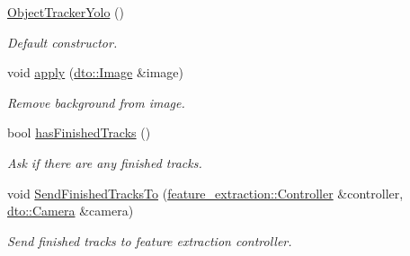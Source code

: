 \begin{DoxyCompactItemize}
\item 
\mbox{\label{classimage__tracking_1_1_object_tracker_yolo_a6f2f07641fa0263d03f43a46e7c7dc83}} 
\mbox{\hyperlink{classimage__tracking_1_1_object_tracker_yolo_a6f2f07641fa0263d03f43a46e7c7dc83}{Object\+Tracker\+Yolo}} ()
\begin{DoxyCompactList}\small\item\em Default constructor. \end{DoxyCompactList}\item 
\mbox{\label{classimage__tracking_1_1_object_tracker_yolo_ad6dcd7145c2880831ed3c4829e1d34fa}} 
void \mbox{\hyperlink{classimage__tracking_1_1_object_tracker_yolo_ad6dcd7145c2880831ed3c4829e1d34fa}{apply}} (\mbox{\hyperlink{structdto_1_1_image}{dto\+::\+Image}} \&image)
\begin{DoxyCompactList}\small\item\em Remove background from image. \end{DoxyCompactList}\item 
\mbox{\label{classimage__tracking_1_1_object_tracker_yolo_a5faf6cc0fe9762de0fde9cb4b5b10d45}} 
bool \mbox{\hyperlink{classimage__tracking_1_1_object_tracker_yolo_a5faf6cc0fe9762de0fde9cb4b5b10d45}{has\+Finished\+Tracks}} ()
\begin{DoxyCompactList}\small\item\em Ask if there are any finished tracks. \end{DoxyCompactList}\item 
\mbox{\label{classimage__tracking_1_1_object_tracker_yolo_a0f46818cc8f0a70e8ffd5f792348aff0}} 
void \mbox{\hyperlink{classimage__tracking_1_1_object_tracker_yolo_a0f46818cc8f0a70e8ffd5f792348aff0}{Send\+Finished\+Tracks\+To}} (\mbox{\hyperlink{classfeature__extraction_1_1_controller}{feature\+\_\+extraction\+::\+Controller}} \&controller, \mbox{\hyperlink{structdto_1_1_camera}{dto\+::\+Camera}} \&camera)
\begin{DoxyCompactList}\small\item\em Send finished tracks to feature extraction controller. \end{DoxyCompactList}\end{DoxyCompactItemize}


